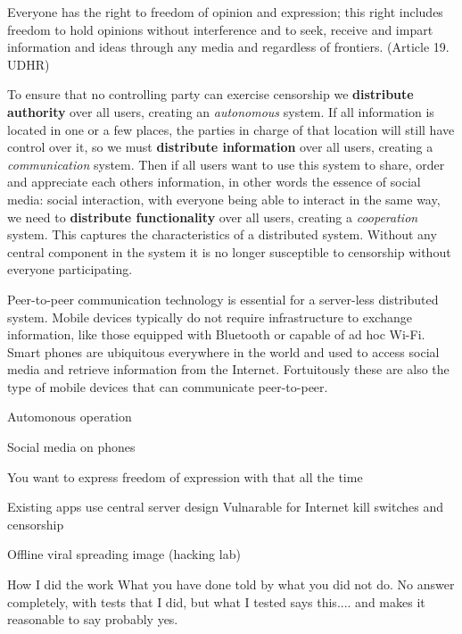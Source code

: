 \begin{displayquote}
Everyone has the right to freedom of opinion and expression; this right includes freedom to hold opinions without interference and to seek, receive and impart information and ideas through any media and regardless of frontiers.
(Article 19. UDHR)
\end{displayquote}

To ensure that no controlling party can exercise censorship we \textbf{distribute authority} over all users, creating an \emph{autonomous} system.
If all information is located in one or a few places, the parties in charge of that location will still have control over it, so we must \textbf{distribute information} over all users, creating a \emph{communication} system.
Then if all users want to use this system to share, order and appreciate each others information, in other words the essence of social media: social interaction, with everyone being able to interact in the same way, we need to  \textbf{distribute functionality} over all users, creating a \emph{cooperation} system.
This captures the characteristics of a distributed system.
Without any central component in the system it is no longer susceptible to censorship without everyone participating.

Peer-to-peer communication technology is essential for a server-less distributed system.
Mobile devices typically do not require infrastructure to exchange information, like those equipped with Bluetooth or capable of ad hoc Wi-Fi.
Smart phones are ubiquitous everywhere in the world and used to access social media and retrieve information from the Internet.
Fortuitously these are also the type of mobile devices that can communicate peer-to-peer.



Automonous operation

Social media on phones

You want to express freedom of expression with that all the time %



Existing apps use central server design
Vulnarable for Internet kill switches and censorship

Offline viral spreading image (hacking lab)


How I did the work
What you have done told by what you did not do.
No answer completely, with tests that I did, but what I tested says this.... and makes it reasonable to say probably yes.


